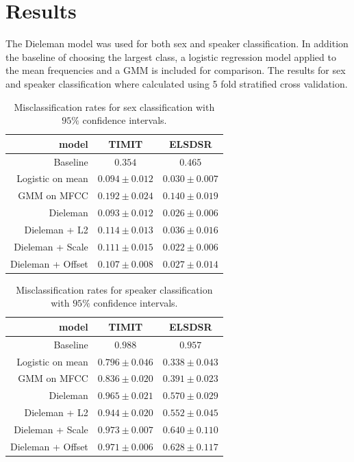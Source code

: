 \section{Results}

The Dieleman model was used for both sex and speaker classification. In addition the baseline of choosing the largest class, a logistic regression model applied to the mean frequencies and a GMM is included for comparison. The results for sex and speaker classification where calculated using 5 fold stratified cross validation.

\begin{table}[H]
\centering
\begin{tabular}{r|c|c}
model & TIMIT & ELSDSR \\ \hline
                    Baseline & $0.354$ & $0.465$ \\
                    Logistic on mean & $0.094 \pm 0.012$ & $0.030 \pm 0.007$ \\
                 GMM on MFCC & $0.192 \pm 0.024$ & $0.140 \pm 0.019$ \\
                    Dieleman & $0.093 \pm 0.012$ & $0.026 \pm 0.006$ \\
     Dieleman + L2 & $0.114 \pm 0.013$ & $0.036 \pm 0.016$ \\
  Dieleman + Scale & $0.111 \pm 0.015$ & $0.022 \pm 0.006$ \\
 Dieleman + Offset & $0.107 \pm 0.008$ & $0.027 \pm 0.014$ \\
\end{tabular}
\caption{Misclassification rates for sex classification with $95\%$ confidence intervals.}
\label{tab:results-sex}
\end{table}

\begin{table}[H]
\centering
\begin{tabular}{r|c|c}
model & TIMIT & ELSDSR \\ \hline
                    Baseline & $0.988$ & $0.957$ \\
                    Logistic on mean & $0.796 \pm 0.046$ & $0.338 \pm 0.043$ \\
                 GMM on MFCC & $0.836 \pm 0.020$ & $0.391 \pm 0.023$ \\
                    Dieleman & $0.965 \pm 0.021$ & $0.570 \pm 0.029$ \\
     Dieleman + L2 & $0.944 \pm 0.020$ & $0.552 \pm 0.045$ \\
  Dieleman + Scale & $0.973 \pm 0.007$ & $0.640 \pm 0.110$ \\
 Dieleman + Offset & $0.971 \pm 0.006$ & $0.628 \pm 0.117$ \\
\end{tabular}
\caption{Misclassification rates for speaker classification with $95\%$ confidence intervals.}
\label{tab:results-speaker}
\end{table}

